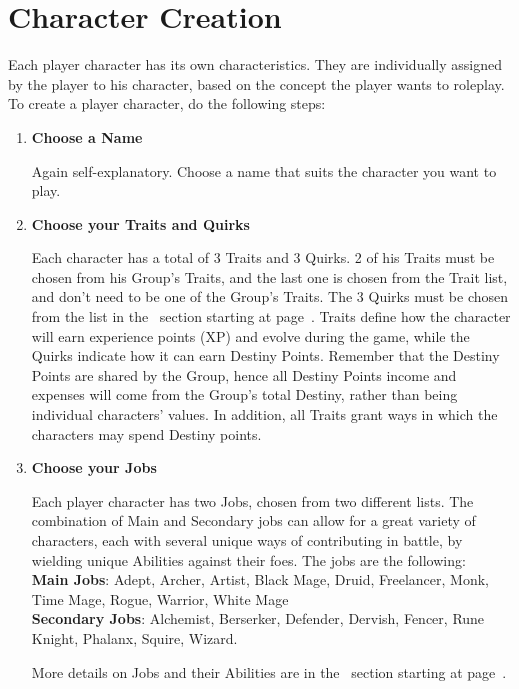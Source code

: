 \section{Character Creation}\label{sec:creation}
\begin{multicols}{2}
Each player character has its own characteristics. They are individually assigned by the player to his character, based on the concept the player wants to roleplay. To create a player character, do the following steps:
\begin{enumerate}
\item \textbf{Choose a Name}

Again self-explanatory. Choose a name that suits the character you want to play.

\item \textbf{Choose your Traits and Quirks}

Each character has a total of 3 Traits and 3 Quirks. 2 of his Traits must be chosen from his Group’s Traits, and the last one is chosen from the Trait list, and don’t need to be one of the Group's Traits. The 3 Quirks must be chosen from the list in the~ section starting at page~\pageref{subsec:quirklist}. Traits define how the character will earn experience points (XP) and evolve during the game, while the Quirks indicate how it can earn Destiny Points. Remember that the Destiny Points are shared by the Group, hence all Destiny Points income and expenses will come from the Group's total Destiny, rather than being individual characters’ values. In addition, all Traits grant ways in which the characters may spend Destiny points.

\item \textbf{Choose your Jobs}

Each player character has two Jobs, chosen from two different lists. The combination of Main and Secondary jobs can allow for a great variety of characters, each with several unique ways of contributing in battle, by wielding unique Abilities against their foes. The jobs are the following: \\
\textbf{Main Jobs}: Adept, Archer, Artist, Black Mage, Druid, Freelancer, Monk, Time Mage, Rogue, Warrior, White Mage \\
\textbf{Secondary Jobs}: Alchemist, Berserker, Defender, Dervish, Fencer, Rune Knight, Phalanx, Squire, Wizard.

More details on Jobs and their Abilities are in the~ section starting at page~\pageref{sec:jobs-summary}.


\end{enumerate}
\end{multicols}
